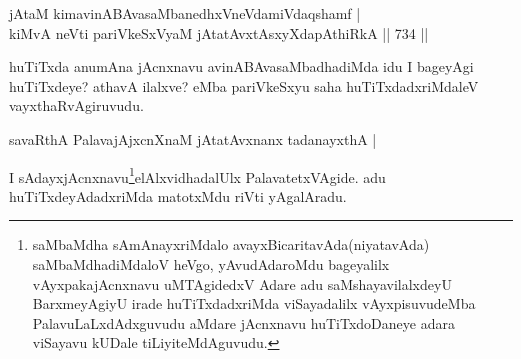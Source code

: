 
\begin{shl}
jAtaM kimavinABAvasaMbanedhxVneVda\footnotemark[2]miVdaqshamf | \\
kiMvA neVti pariVkeSxVyaM jAtatAvxtAsxyXdapAthiRkA \hfill||  734 ||  
\end{shl}

\begin{artha}
huTiTxda anumAna jAcnxnavu avinABAvasaMbadhadiMda idu I bageyAgi huTiTxdeye? athavA ilalxve? eMba pariVkeSxyu saha huTiTxdadxriMdaleV vayxthaRvAgiruvudu.
\end{artha}

\begin{shl}
savaRthA PalavajAjxcnXnaM jAtatAvxnanx tadanayxthA | \\
\end{shl}

\begin{artha}
I sAdayxjAcnxnavu\footnote{saMbaMdha sAmAnayxriMdalo avayxBicaritavAda(niyatavAda) saMbaMdhadiMdaloV heVgo, yAvudAdaroMdu bageyalilx vAyxpakajAcnxnavu uMTAgidedxV Adare adu saMshayavilalxdeyU BarxmeyAgiyU irade huTiTxdadxriMda viSayadalilx vAyxpisuvudeMba  PalavuLaLxdAdxguvudu aMdare jAcnxnavu huTiTxdoDaneye adara viSayavu kUDale tiLiyiteMdAguvudu.}elAlxvidhadalUlx PalavatetxVAgide. adu huTiTxdeyAdadxriMda matotxMdu riVti yAgalAradu.
\end{artha}

